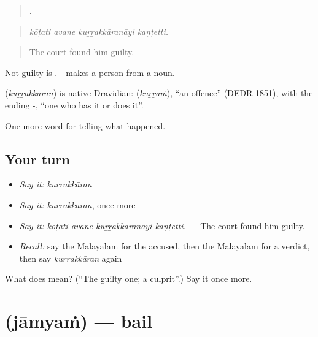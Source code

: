 \begin{quote}
   .
\end{quote}

\begin{quote}
\emph{kōṭati avane kuṟṟakkāranāyi kaṇṭetti.}
\end{quote}

\begin{quote}
The court found him guilty.
\end{quote}

Not guilty is  . - makes a person from a noun.

\begin{cousinweb}
\textbf{} (\emph{kuṟṟakkāran}) is native Dravidian:  (\emph{kuṟṟaṁ}), \textquotedblleft{}an offence\textquotedblright{} (DEDR 1851), with the ending -, \textquotedblleft{}one who has it or does it\textquotedblright{}.
\end{cousinweb}

\begin{grammarlens}[title={What you've built}]
One more word for telling what happened.
\end{grammarlens}

\subsection*{Your turn}
\begin{itemize}
\raggedright
  \item \emph{Say it:} \emph{kuṟṟakkāran}
  \item \emph{Say it:} \emph{kuṟṟakkāran}, once more
  \item \emph{Say it:} \emph{kōṭati avane kuṟṟakkāranāyi kaṇṭetti.} — The court found him guilty.
  \item \emph{Recall:} say the Malayalam for the accused, then the Malayalam for a verdict, then say \emph{kuṟṟakkāran} again
\end{itemize}

\begin{tcolorbox}[breakable,colback=teal!4,colframe=teal!35!black,title={Before you move on}]
What does  mean? (\textquotedblleft{}The guilty one; a culprit\textquotedblright{}.) Say it once more.
\end{tcolorbox}
\section[\texorpdfstring{\ml{ജാമ്യം} (jāmyaṁ)}{ജാമ്യം (jāmyaṁ)}]{ (jāmyaṁ) — bail}

